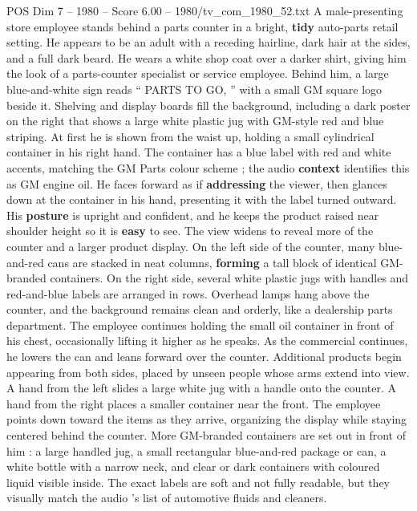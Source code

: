 \begin{textsample}{POS Dim 7 – 1980 – Score 6.00 – 1980/tv\_com\_1980\_52.txt}  \label{ex:f7_pos_047}
A male-presenting store employee stands behind a parts counter in a bright, \textbf{tidy} auto-parts retail setting.
He appears to be an adult with a receding hairline, dark hair at the sides, and a full dark beard.
He wears a white shop coat over a darker shirt, giving him the look of a parts-counter specialist or service employee.
Behind him, a large blue-and-white sign reads “ PARTS TO GO, ” with a small GM square logo beside it.
Shelving and display boards fill the background, including a dark poster on the right that shows a large white plastic jug with GM-style red and blue striping.
At first he is shown from the waist up, holding a small cylindrical container in his right hand.
The container has a blue label with red and white accents, matching the GM Parts colour scheme ; the audio \textbf{context} identifies this as GM engine oil.
He faces forward as if \textbf{addressing} the viewer, then glances down at the container in his hand, presenting it with the label turned outward.
His \textbf{posture} is upright and confident, and he keeps the product raised near shoulder height so it is \textbf{easy} to see.
The view widens to reveal more of the counter and a larger product display.
On the left side of the counter, many blue-and-red cans are stacked in neat columns, \textbf{forming} a tall block of identical GM-branded containers.
On the right side, several white plastic jugs with handles and red-and-blue labels are arranged in rows.
Overhead lamps hang above the counter, and the background remains clean and orderly, like a dealership parts department.
The employee continues holding the small oil container in front of his chest, occasionally lifting it higher as he speaks.
As the commercial continues, he lowers the can and leans forward over the counter.
Additional products begin appearing from both sides, placed by unseen people whose arms extend into view.
A hand from the left slides a large white jug with a handle onto the counter.
A hand from the right places a smaller container near the front.
The employee points down toward the items as they arrive, organizing the display while staying centered behind the counter.
More GM-branded containers are set out in front of him : a large handled jug, a small rectangular blue-and-red package or can, a white bottle with a narrow neck, and clear or dark containers with coloured liquid visible inside.
The exact labels are soft and not fully readable, but they visually match the audio ’s list of automotive fluids and cleaners.

\end{textsample}
